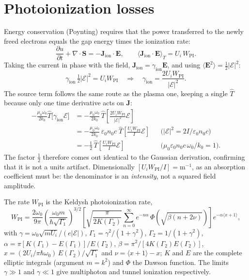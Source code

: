 \documentclass[11pt,a4paper]{article}
\begin{document}
\section{Photoionization losses}

Energy conservation (Poynting) requires that the power transferred to the newly
freed electrons equals the gap energy times the ionization rate:
\begin{equation}
\frac{\partial u}{\partial t}+\nabla\!\cdot\!\mathbf{S}
 = -\mathbf{J}_{\text{ion}}\!\cdot\!\mathbf{E},
\qquad
\big\langle \mathbf{J}_{\text{ion}}\!\cdot\!\mathbf{E}\big\rangle_T
 = U_i\,W_{\text{PI}} .
\end{equation}
Taking the current in phase with the field, $\mathbf{J}_{\text{ion}}=\gamma_{\text{ion}}\mathbf{E}$,
and using $\langle\mathbf{E}^2\rangle=\tfrac12|\mathcal{E}|^2$:
\begin{equation}
\gamma_{\text{ion}}\,\tfrac12|\mathcal{E}|^2 = U_iW_{\text{PI}}
\quad\Longrightarrow\quad
\gamma_{\text{ion}} = \frac{2U_iW_{\text{PI}}}{|\mathcal{E}|^2}.
\end{equation}
The source term follows the same route as the plasma one, keeping a single
$\hat T$ because only one time derivative acts on $\mathbf{J}$:
\begin{align}
-\frac{\mu_0\omega_0}{2k_0}\hat T\big[\gamma_{\text{ion}}\mathcal{E}\big]
&= -\frac{\mu_0\omega_0}{2k_0}\,\hat T\!\left[\frac{2U_iW_{\text{PI}}}{|\mathcal{E}|^2}\mathcal{E}\right]
\nonumber\\
&= -\frac{\mu_0\omega_0}{2k_0}\,\varepsilon_0 n_0 c\;
    \hat T\!\left[\frac{U_iW_{\text{PI}}}{I}\mathcal{E}\right]
&&\big(|\mathcal{E}|^2 = 2I/\varepsilon_0n_0c\big)
\nonumber\\
&= -\frac{1}{2}\,\hat T\!\left[\frac{U_iW_{\text{PI}}}{I}\mathcal{E}\right]
&&\big(\mu_0\varepsilon_0 n_0 c\,\omega_0/k_0 = 1\big).
\end{align}
The factor $\tfrac12$ therefore comes out identical to the Gaussian derivation,
confirming that it is not a units artifact. Dimensionally
$[U_iW_{\text{PI}}/I]=\text{m}^{-1}$, as an absorption coefficient must be: the
denominator is an \emph{intensity}, not a squared field amplitude.

The rate $W_{\text{PI}}$ is the Keldysh photoionization rate,
\begin{equation}
W_{\text{PI}}
 = \frac{2\omega_0}{9\pi}\left(\frac{\omega_0 m}{\hbar\sqrt{\Gamma_1}}\right)^{3/2}
   \left[\sqrt{\frac{\pi}{2K(\Gamma_2)}}\sum_{n=0}^{\infty}e^{-n\alpha}\,
   \Phi\!\left(\sqrt{\beta(n+2\nu)}\right)\right] e^{-\alpha\langle x+1\rangle},
\end{equation}
with $\gamma=\omega_0\sqrt{mU_i}/(e|\mathcal{E}|)$,
$\Gamma_1=\gamma^2/(1+\gamma^2)$, $\Gamma_2=1/(1+\gamma^2)$,
$\alpha=\pi[K(\Gamma_1)-E(\Gamma_1)]/E(\Gamma_2)$,
$\beta=\pi^2/[4K(\Gamma_2)E(\Gamma_2)]$,
$x=(2U_i/\pi\hbar\omega_0)\,E(\Gamma_2)/\sqrt{\Gamma_1}$ and
$\nu=\langle x+1\rangle-x$; $K$ and $E$ are the complete elliptic integrals
(argument $m=k^2$) and $\Phi$ the Dawson function. The limits $\gamma\gg1$ and
$\gamma\ll1$ give multiphoton and tunnel ionization respectively.
\end{document}

